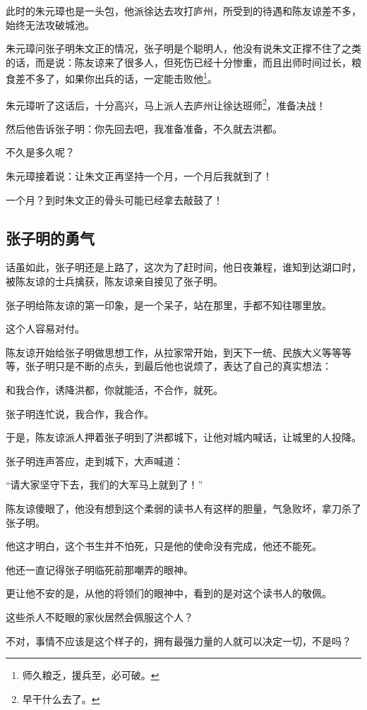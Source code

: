 \begin{multicols}{\theparacolNo}
		此时的朱元璋也是一头包，他派徐达去攻打庐州，所受到的待遇和陈友谅差不多，始终无法攻破城池。

		朱元璋问张子明朱文正的情况，张子明是个聪明人，他没有说朱文正撑不住了之类的话，而是说：陈友谅来了很多人，但死伤已经十分惨重，而且出师时间过长，粮食差不多了，如果你出兵的话，一定能击败他\footnote{师久粮乏，援兵至，必可破。}。

		朱元璋听了这话后，十分高兴，马上派人去庐州让徐达班师\footnote{早干什么去了。}，准备决战！

		然后他告诉张子明：你先回去吧，我准备准备，不久就去洪都。

		不久是多久呢？

		朱元璋接着说：让朱文正再坚持一个月，一个月后我就到了！

		一个月？到时朱文正的骨头可能已经拿去敲鼓了！

		\subsection{张子明的勇气}
		话虽如此，张子明还是上路了，这次为了赶时间，他日夜兼程，谁知到达湖口时，被陈友谅的士兵擒获，陈友谅亲自接见了张子明。

		张子明给陈友谅的第一印象，是一个呆子，站在那里，手都不知往哪里放。

		这个人容易对付。

		陈友谅开始给张子明做思想工作，从拉家常开始，到天下一统、民族大义等等等等，张子明只是不断的点头，到最后他也说烦了，表达了自己的真实想法：

		和我合作，诱降洪都，你就能活，不合作，就死。

		张子明连忙说，我合作，我合作。

		于是，陈友谅派人押着张子明到了洪都城下，让他对城内喊话，让城里的人投降。

		张子明连声答应，走到城下，大声喊道：

		“请大家坚守下去，我们的大军马上就到了！”

		陈友谅傻眼了，他没有想到这个柔弱的读书人有这样的胆量，气急败坏，拿刀杀了张子明。

		他这才明白，这个书生并不怕死，只是他的使命没有完成，他还不能死。

		他还一直记得张子明临死前那嘲弄的眼神。

		更让他不安的是，从他的将领们的眼神中，看到的是对这个读书人的敬佩。

		这些杀人不眨眼的家伙居然会佩服这个人？

		不对，事情不应该是这个样子的，拥有最强力量的人就可以决定一切，不是吗？


\end{multicols}
